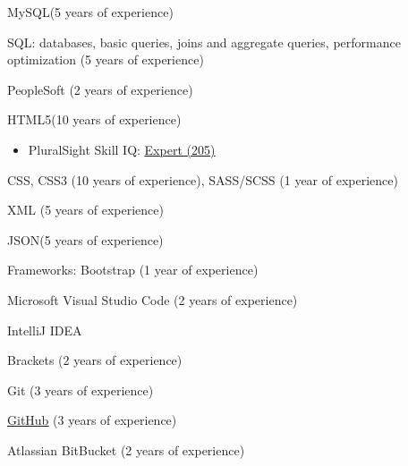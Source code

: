 \documentclass[]{deedy-resume-openfont}
\begin{document}
\descript{}
\begin{tightemize}
\item MySQL\footnotemark[\value{footnote}] (5 years of experience)
\item SQL: databases, basic queries, joins and aggregate queries, performance optimization (5 years of experience)
\item PeopleSoft (2 years of experience)
\end{tightemize}
\sectionsep

\descript{}
\begin{tightemize}
\item HTML5\footnotemark[\value{footnote}] (10 years of experience)
\begin{itemize}
\item PluralSight Skill IQ: \href{https://app.pluralsight.com/profile/alexander-koik-cesto}{\underline{Expert (205)}}
\end{itemize}
\item CSS\footnotemark[\value{footnote}], CSS3 (10 years of experience), SASS/SCSS (1 year of experience)
\item XML (5 years of experience)
\item JSON\footnotemark[\value{footnote}] (5 years of experience)
\item Frameworks: Bootstrap (1 year of experience)
\end{tightemize}
\sectionsep

\descript{}
\begin{tightemize}
\item Microsoft Visual Studio Code (2 years of experience)
\item IntelliJ IDEA
\item Brackets (2 years of experience)
\end{tightemize}
\sectionsep

\descript{}
\begin{tightemize}
\item Git (3 years of experience)
\item \href{https://github.com/sirkoik}{\underline{GitHub}} (3 years of experience)
\item Atlassian BitBucket (2 years of experience)
\end{tightemize}
\sectionsep


\newpage
\end{document}
